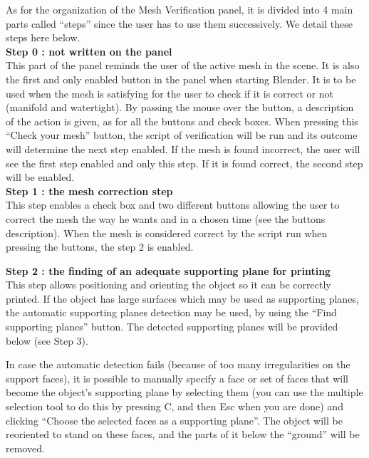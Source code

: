 \documentclass{article}
\begin{document}
As for the organization of the Mesh Verification panel, it is divided into 4 main parts called ``steps'' since the user has to use them successively. We detail these steps here below.\\

\textbf{Step 0 : not written on the panel} \\

This part of the panel reminds the user of the active mesh in the scene. It is also the first and only enabled button in the panel when starting Blender. It is to be used when the mesh is satisfying for the user to check if it is correct or not (manifold and watertight). By passing the mouse over the button, a description of the action is given, as for all the buttons and check boxes. When pressing this ``Check your mesh'' button, the script of verification will be run and its outcome will determine the next step enabled. If the mesh is found incorrect, the user will see the first step enabled and only this step. If it is found correct, the second step will be enabled.\\

\textbf{Step 1 : the mesh correction step} \\

This step enables a check box and two different buttons allowing the user to correct the mesh the way he wants and in a chosen time (see the buttons description). When the mesh is considered correct by the script run when pressing the buttons, the step 2 is enabled. 

\newpage

\textbf{Step 2 : the finding of an adequate supporting plane for printing}\\

This step allows positioning and orienting the object so it can be correctly printed.
If the object has large surfaces which may be used as supporting planes, the automatic supporting planes detection may be used, by using the ``Find supporting planes'' button. The detected supporting planes will be provided below (see Step 3).

In case the automatic detection fails (because of too many irregularities on the support faces), it is possible to manually specify a face or set of faces that will become the object’s supporting plane by selecting them (you can use the multiple selection tool to do this by pressing C, and then Esc when you are done) and clicking ``Choose the selected faces as a supporting plane''. The object will be reoriented to stand on these faces, and the parts of it below the ``ground'' will be removed.
\end{document}
